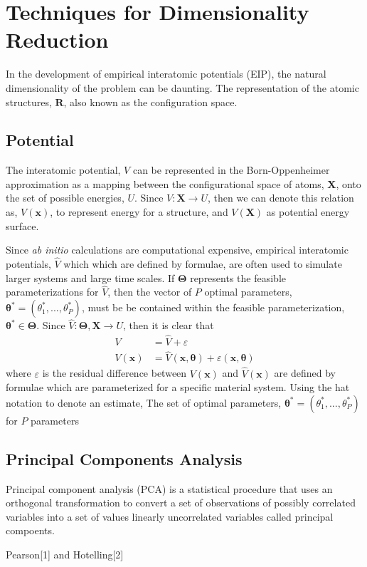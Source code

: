 \chapter{Techniques for Dimensionality Reduction}

In the development of empirical interatomic potentials (EIP), the natural dimensionality of the problem can be daunting.
The representation of the atomic structures, $\bm{R}$, also known as the configuration space.

\section{Potential}

The interatomic potential, $V$ can be represented in the Born-Oppenheimer approximation as a mapping between the configurational space of atoms, $\bm{X}$, onto the set of possible energies, $U$.
Since $V:\bm{X} \rightarrow U$, then we can denote this relation as, $V(\bm{x})$, to represent energy for a structure, and $V(\bm{X})$ as potential energy surface.

Since \emph{ab initio} calculations are computational expensive, empirical interatomic potentials, $\hat{V}$ which which are defined by formulae, are often used to simulate larger systems and large time scales.
If $\bm{\Theta}$ represents the feasible parameterizations for $\hat{V}$, then the vector of $P$ optimal parameters, $\bm{\theta}^{*} = (\theta_1^{*},...,\theta_P^{*})$, must be be contained within the feasible parameterization, $\bm{\theta}^{*} \in \bm{\Theta}$.
Since $\hat{V}:\bm{\Theta},\bm{X} \rightarrow U$, then it is clear that
\begin{align}
  V &= \hat{V} + \varepsilon \\
  V(\bm{x}) &= \hat{V}(\bm{x},\bm{\theta}) + \varepsilon(\bm{x},\bm{\theta})
\end{align}
where $\varepsilon$ is the residual difference between $V(\bm{x})$ and $\hat{V}(\bm{x})$
 are defined by formulae which are parameterized for a specific material system.  Using the hat notation to denote an estimate,   The set of optimal parameters, $\bm{\theta}^{*} = (\theta_1^{*},...,\theta_P^{*})$ for $P$ parameters

\section{Principal Components Analysis}



Principal component analysis (PCA) is a statistical procedure that uses an orthogonal transformation to convert a set of observations of possibly correlated variables into a set of values linearly uncorrelated variables called principal compoents.

Pearson[1] and Hotelling[2]
